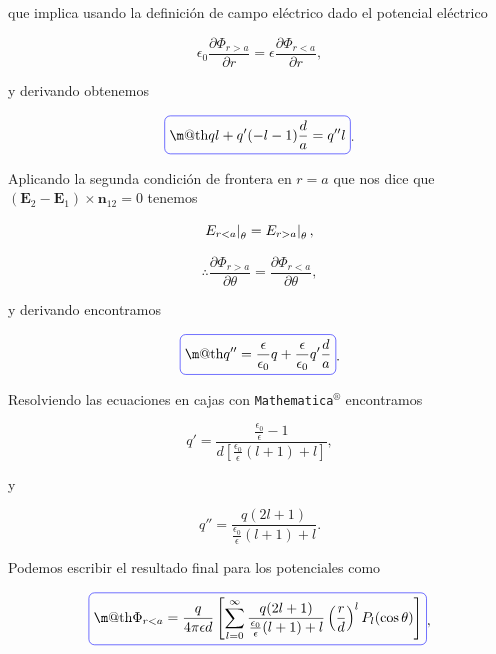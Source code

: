\documentclass[a4paper,11pt]{article}
\makeatletter
\numberwithin{equation}{section}
\newcommand{\zerodel}{.\kern-\nulldelimiterspace}
\newcommand*{\boxcolor}{blue}
\renewcommand{\boxed}[1]{\textcolor{\boxcolor}{%
\tikz[baseline={([yshift=-1ex]current bounding box.center)}] \node [rectangle, minimum width=1ex,rounded corners,draw] {\normalcolor\m@th$\displaystyle#1$};}}
\makeatother
\begin{document}
que implica usando la definición de campo eléctrico dado el potencial eléctrico 

\begin{equation}
 \epsilon_0 \frac{\partial \Phi_{r > a}}{\partial r} = \epsilon 
 \frac{\partial \Phi_{r < a}}{\partial r},
\end{equation}

y derivando obtenemos 

\begin{equation}
 \boxed{ql + q'(-l -1)\frac{d}{a} = q'' l}.
\end{equation}

Aplicando la segunda condición de frontera en $r = a$ que nos dice que 
$(\mathbf{E}_2 - \mathbf{E}_1) \times \mathbf{n}_{12} = 0$ tenemos 

\begin{equation}
 \left\zerodel E_{r < a}\right|_\theta = \left\zerodel E_{r > a}\right|_\theta,
\end{equation}

\begin{equation}
 \therefore \frac{\partial \Phi_{r > a}}{\partial \theta} = 
 \frac{\partial \Phi_{r < a}}{\partial \theta},
\end{equation}

y derivando encontramos 

\begin{equation}
 \boxed{q'' = \frac{\epsilon}{\epsilon_0}q + \frac{\epsilon}{\epsilon_0}q'\frac{d}{a}}.
\end{equation}

Resolviendo las ecuaciones en cajas con \texttt{Mathematica$^\circledR$} encontramos 

\begin{equation}
 q' = \frac{\frac{\epsilon_0}{\epsilon} - 1}{d\left[\frac{\epsilon_0}{\epsilon}(l+1) + l\right]},
\end{equation}

y 

\begin{equation}
 q'' = \frac{q(2l + 1)}{\frac{\epsilon_0}{\epsilon}(l+1) +l}.
\end{equation}

Podemos escribir el resultado final para los potenciales como 

\begin{equation}
 \boxed{\Phi_{r < a} = \frac{q}{4\pi\epsilon d}\left[\sum_{l=0}^\infty 
 \frac{q(2l + 1)}{\frac{\epsilon_0}{\epsilon}(l+1) +l} \left(\frac{r}{d}\right)^l
 P_l(\cos{\theta})\right]},
\end{equation}
\end{document}

